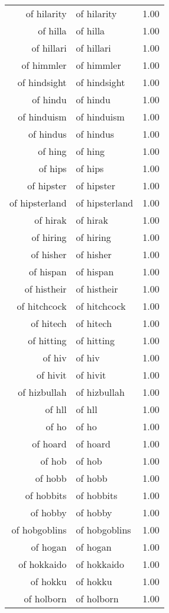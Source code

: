 \begin{table}[ht]
\begin{tabular}{rlr}
  of hilarity & of hilarity & 1.00 \\ 
  of hilla & of hilla & 1.00 \\ 
  of hillari & of hillari & 1.00 \\ 
  of himmler & of himmler & 1.00 \\ 
  of hindsight & of hindsight & 1.00 \\ 
  of hindu & of hindu & 1.00 \\ 
  of hinduism & of hinduism & 1.00 \\ 
  of hindus & of hindus & 1.00 \\ 
  of hing & of hing & 1.00 \\ 
  of hips & of hips & 1.00 \\ 
  of hipster & of hipster & 1.00 \\ 
  of hipsterland & of hipsterland & 1.00 \\ 
  of hirak & of hirak & 1.00 \\ 
  of hiring & of hiring & 1.00 \\ 
  of hisher & of hisher & 1.00 \\ 
  of hispan & of hispan & 1.00 \\ 
  of histheir & of histheir & 1.00 \\ 
  of hitchcock & of hitchcock & 1.00 \\ 
  of hitech & of hitech & 1.00 \\ 
  of hitting & of hitting & 1.00 \\ 
  of hiv & of hiv & 1.00 \\ 
  of hivit & of hivit & 1.00 \\ 
  of hizbullah & of hizbullah & 1.00 \\ 
  of hll & of hll & 1.00 \\ 
  of ho & of ho & 1.00 \\ 
  of hoard & of hoard & 1.00 \\ 
  of hob & of hob & 1.00 \\ 
  of hobb & of hobb & 1.00 \\ 
  of hobbits & of hobbits & 1.00 \\ 
  of hobby & of hobby & 1.00 \\ 
  of hobgoblins & of hobgoblins & 1.00 \\ 
  of hogan & of hogan & 1.00 \\ 
  of hokkaido & of hokkaido & 1.00 \\ 
  of hokku & of hokku & 1.00 \\ 
  of holborn & of holborn & 1.00 \\ 

\end{tabular}
\end{table}
